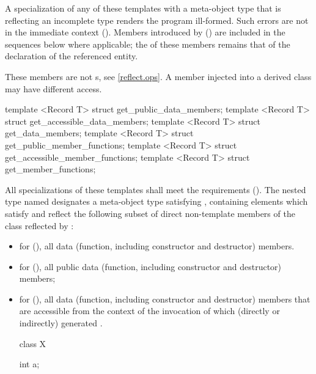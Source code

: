 \begin{std.txt}\color{addclr}
\pnum
A specialization of any of these templates with a meta-object type that is
reflecting an incomplete type renders the program ill-formed.  Such errors are
not in the immediate context ().
Members introduced by  () are included in the sequences below where applicable; the  of these members remains that of the declaration of the referenced entity. \begin{note} These members are not s, see \ref{reflect.ops}. A member injected into a derived class may have different access. \end{note}

\begin{itemdecl}
template <Record T> struct get_public_data_members;
template <Record T> struct get_accessible_data_members;
template <Record T> struct get_data_members;
template <Record T> struct get_public_member_functions;
template <Record T> struct get_accessible_member_functions;
template <Record T> struct get_member_functions;
\end{itemdecl}

\begin{itemdescr}
\pnum
All specializations of these templates shall meet the  requirements (). The nested type named  designates a meta-object type satisfying , containing elements which satisfy  and reflect the following subset of direct non-template members of the class reflected by :
\begin{itemize}
  \item for  (), all data (function, including constructor and destructor) members.
  \item for  (), all public data (function, including constructor and destructor) members;
  \item for  (), all data (function, including constructor and destructor) members that are accessible from the context of the invocation of  which (directly or indirectly) generated .
\begin{example}\begin{codeblock}
class X {
   int a;

}
\end{codeblock}
\end{example}
\end{itemize}
\end{itemdescr}
\end{std.txt}
